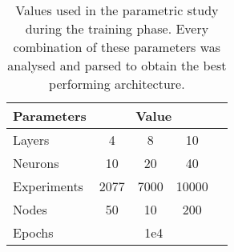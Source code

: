 \begin{table}[!hb]
  \centering
\begin{tabular}{l|cccc}
\textbf{Parameters} & \multicolumn{3}{c}{\textbf{Value}} \\ \hline
Layers              & 4      & 8       & 10            \\
Neurons             & 10     & 20      & 40           \\
Experiments         & 2077    & 7000    & 10000      \\
Nodes               & 50     & 10      & 200           \\
Epochs              &  \multicolumn{3}{c}{1e4}        
\end{tabular}
  \caption{Values used in the parametric study during the training phase. Every combination of these parameters was analysed and parsed to obtain the best performing architecture.}
\end{table}







